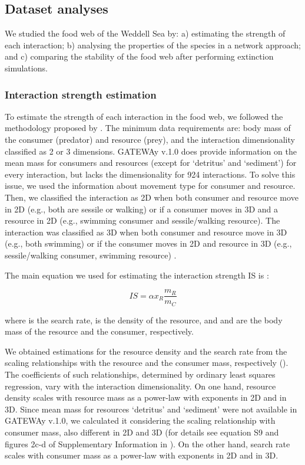\documentclass[gc, manuscript]{copernicus}
\begin{document}
\subsection{Dataset analyses}

We studied the food web of the Weddell Sea by: a) estimating the
strength of each interaction; b) analysing the properties of the species
in a network approach; and c) comparing the stability of the food web
after performing extinction simulations.

\subsubsection{Interaction strength estimation}

To estimate the strength of each interaction in the food web, we
followed the methodology proposed by \citet{Pawar2012}. The minimum data
requirements are: body mass of the consumer (predator) and resource
(prey), and the interaction dimensionality classified as 2 or 3
dimensions. GATEWAy v.1.0 does provide information on the mean mass for
consumers and resources (except for `detritus' and `sediment') for every
interaction, but lacks the dimensionality for 924 interactions. To solve
this issue, we used the information about movement type for consumer and
resource. Then, we classified the interaction as 2D when both consumer
and resource move in 2D (e.g., both are sessile or walking) or if a
consumer moves in 3D and a resource in 2D (e.g., swimming consumer and
sessile/walking resource). The interaction was classified as 3D when
both consumer and resource move in 3D (e.g., both swimming) or if the
consumer moves in 2D and resource in 3D (e.g., sessile/walking consumer,
swimming resource) \citep{Pawar2012}.

The main equation we used for estimating the interaction strength IS is
\citep{Pawar2012}:

\begin{equation}
IS = \alpha x_R \frac{m_R}{m_C}
\end{equation}

where \vec{\alpha} is the search rate,  is the density of the
resource, and  and  are the body mass of the resource
and the consumer, respectively.

We obtained estimations for the resource density and the search rate
from the scaling relationships with the resource and the consumer mass,
respectively (\citet{Pawar2012}). The coefficients of such
relationships, determined by ordinary least squares regression, vary
with the interaction dimensionality. On one hand, resource density
scales with resource mass as a power-law with exponents
 in 2D and  in 3D. Since
mean mass for resources `detritus' and `sediment' were not available in
GATEWAy v.1.0, we calculated it considering the scaling relationship
with consumer mass, also different in 2D and 3D (for details see
equation S9 and figures 2c-d of Supplementary Information in
\citet{Pawar2012}). On the other hand, search rate scales with consumer
mass as a power-law with exponents  in 2D and
 in 3D.
\end{document}

